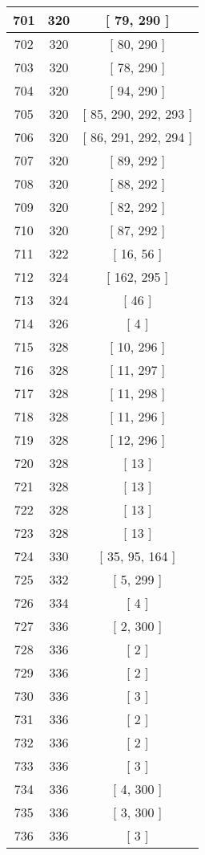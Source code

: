 \begin{center}
\begin{longtable}[H]{|| c c c ||}
\hline
701 & 320 & [ 79, 290 ] \\ 
\hline
702 & 320 & [ 80, 290 ] \\ 
\hline
703 & 320 & [ 78, 290 ] \\ 
\hline
704 & 320 & [ 94, 290 ] \\ 
\hline
705 & 320 & [ 85, 290, 292, 293 ] \\ 
\hline
706 & 320 & [ 86, 291, 292, 294 ] \\ 
\hline
707 & 320 & [ 89, 292 ] \\ 
\hline
708 & 320 & [ 88, 292 ] \\ 
\hline
709 & 320 & [ 82, 292 ] \\ 
\hline
710 & 320 & [ 87, 292 ] \\ 
\hline
711 & 322 & [ 16, 56 ] \\ 
\hline
712 & 324 & [ 162, 295 ] \\ 
\hline
713 & 324 & [ 46 ] \\ 
\hline
714 & 326 & [ 4 ] \\ 
\hline
715 & 328 & [ 10, 296 ] \\ 
\hline
716 & 328 & [ 11, 297 ] \\ 
\hline
717 & 328 & [ 11, 298 ] \\ 
\hline
718 & 328 & [ 11, 296 ] \\ 
\hline
719 & 328 & [ 12, 296 ] \\ 
\hline
720 & 328 & [ 13 ] \\ 
\hline
721 & 328 & [ 13 ] \\ 
\hline
722 & 328 & [ 13 ] \\ 
\hline
723 & 328 & [ 13 ] \\ 
\hline
724 & 330 & [ 35, 95, 164 ] \\ 
\hline
725 & 332 & [ 5, 299 ] \\ 
\hline
726 & 334 & [ 4 ] \\ 
\hline
727 & 336 & [ 2, 300 ] \\ 
\hline
728 & 336 & [ 2 ] \\ 
\hline
729 & 336 & [ 2 ] \\ 
\hline
730 & 336 & [ 3 ] \\ 
\hline
731 & 336 & [ 2 ] \\ 
\hline
732 & 336 & [ 2 ] \\ 
\hline
733 & 336 & [ 3 ] \\ 
\hline
734 & 336 & [ 4, 300 ] \\ 
\hline
735 & 336 & [ 3, 300 ] \\ 
\hline
736 & 336 & [ 3 ] \\ 

\end{longtable}
\end{center}
